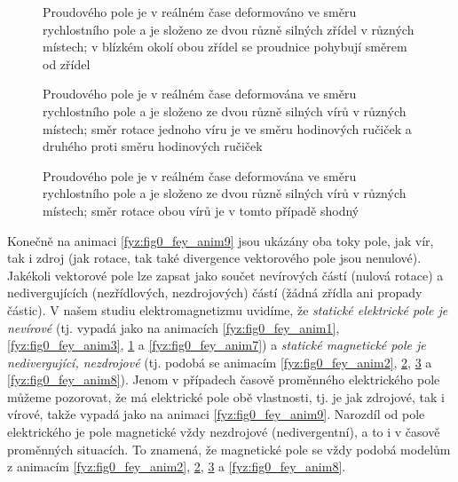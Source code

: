       \begin{figure}[ht!]
        \centering
        \caption{Proudového pole je v reálném čase deformováno ve směru rychlostního pole a je 
                  složeno ze dvou různě silných zřídel v různých místech; v blízkém okolí obou zřídel 
                  se proudnice pohybují směrem od zřídel}
        \label{fyz:fig0_fey_anim4}
      \end{figure} 
  
      \begin{figure}[ht!]
        \centering  
        \caption{Proudového pole je v reálném čase deformována ve směru rychlostního pole a je 
                  složeno ze dvou různě silných vírů v různých místech; směr rotace jednoho víru je ve 
                  směru hodinových ručiček a druhého proti směru hodinových ručiček}
        \label{fyz:fig0_fey_anim5}
      \end{figure} 
  
      \begin{figure}[ht!]
        \centering
        \caption{Proudového pole je v reálném čase deformována ve směru rychlostního pole a je  
                  složeno ze dvou různě silných vírů v různých místech; směr rotace obou vírů je v 
                  tomto případě shodný}
        \label{fyz:fig0_fey_anim6}
      \end{figure} 
      
      Konečně na animaci \ref{fyz:fig0_fey_anim9} jsou ukázány oba toky pole, jak vír, tak i zdroj
      (jak rotace, tak také divergence vektorového pole jsou nenulové). Jakékoli vektorové pole lze
      zapsat jako součet nevírových částí (nulová rotace) a nedivergujících (nezřídlových,
      nezdrojových) částí (žádná zřídla ani propady částic). V našem studiu elektromagnetizmu
      uvidíme, že\emph{ statické elektrické pole je nevírové} (tj. vypadá jako na animacích
      \ref{fyz:fig0_fey_anim1}, \ref{fyz:fig0_fey_anim3}, \ref{fyz:fig0_fey_anim4} a
      \ref{fyz:fig0_fey_anim7}) a \emph{statické magnetické pole je nedivergující, nezdrojové} (tj.
      podobá se animacím \ref{fyz:fig0_fey_anim2}, \ref{fyz:fig0_fey_anim5},
      \ref{fyz:fig0_fey_anim6} a \ref{fyz:fig0_fey_anim8}). Jenom v případech časově proměnného
      elektrického pole můžeme pozorovat, že má elektrické pole obě vlastnosti, tj. je jak zdrojové,
      tak i vírové, takže vypadá jako na animaci \ref{fyz:fig0_fey_anim9}. Narozdíl od pole
      elektrického je pole magnetické vždy nezdrojové (nedivergentní), a to i v časově proměnných
      situacích. To znamená, že magnetické pole se vždy podobá modelům z animacím
      \ref{fyz:fig0_fey_anim2}, \ref{fyz:fig0_fey_anim5}, \ref{fyz:fig0_fey_anim6} a
      \ref{fyz:fig0_fey_anim8}.              
      
